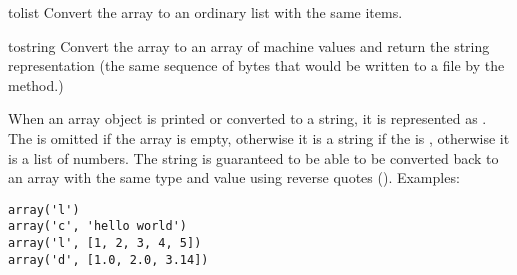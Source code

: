\begin{funcdesc}{tolist}{}
Convert the array to an ordinary list with the same items.
\end{funcdesc}

\begin{funcdesc}{tostring}{}
Convert the array to an array of machine values and return the
string representation (the same sequence of bytes that would
be written to a file by the  method.)
\end{funcdesc}

When an array object is printed or converted to a string, it is
represented as .  The
 is omitted if the array is empty, otherwise it is a
string if the  is , otherwise it is a list of
numbers.  The string is guaranteed to be able to be converted back to
an array with the same type and value using reverse quotes
().  Examples:

\bcode\begin{verbatim}
array('l')
array('c', 'hello world')
array('l', [1, 2, 3, 4, 5])
array('d', [1.0, 2.0, 3.14])
\end{verbatim}\ecode
